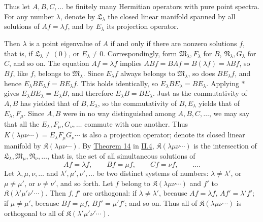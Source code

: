 \documentclass[fontsize=13pt,twoside,openany,headings=normal,parskip=false,bookmarkpackage=false,DIV=calc]{scrbook}
\begin{document}
Thus let $A,B,C,\ldots$ be finitely many Hermitian operators with pure point spectra. For any number $\lambda$, denote by $\mathfrak L_\lambda$ the closed linear manifold spanned by all solutions of $Af=\lambda f$, and by $E_\lambda$ its projection operator.

\hypertarget{origpage-91}{}%
Then $\lambda$ is a point eigenvalue of $A$ if and only if there are nonzero solutions $f$, that is, if $\mathfrak L_\lambda\ne(0)$, or $E_\lambda\ne0$. Correspondingly, form $\mathfrak M_\lambda,F_\lambda$ for $B$, $\mathfrak N_\lambda,G_\lambda$ for $C$, and so on. The equation $Af=\lambda f$ implies $ABf=BAf=B(\lambda f)=\lambda Bf$, so $Bf$, like $f$, belongs to $\mathfrak M_\lambda$.  Since $E_\lambda f$ always belongs to $\mathfrak M_\lambda$, so does $BE_\lambda f$, and hence $E_\lambda BE_\lambda f=BE_\lambda f$. This holds identically, so $E_\lambda BE_\lambda=BE_\lambda$. Applying $*$ gives $E_\lambda BE_\lambda=E_\lambda B$, and therefore $E_\lambda B=BE_\lambda$. Just as the commutativity of $A,B$ has yielded that of $B,E_\lambda$, so the commutativity of $B,E_\lambda$ yields that of $E_\lambda,F_\mu$. Since $A,B$ were in no way distinguished among $A,B,C,\ldots$, we may say that all the $E_\lambda,F_\mu,G_\nu,\ldots$ commute with one another. Thus $K(\lambda\mu\nu\cdots)=E_\lambda F_\mu G_\nu\cdots$ is also a projection operator; denote its closed linear manifold by $\mathfrak K(\lambda\mu\nu\cdots)$. By \hyperref[thm:II.14]{Theorem 14} in \hyperref[sec:II.4]{II.4}, $\mathfrak K(\lambda\mu\nu\cdots)$ is the intersection of $\mathfrak L_\lambda,\mathfrak M_\mu,\mathfrak N_\nu,\ldots$, that is, the set of all simultaneous solutions of
\[
Af=\lambda f,\qquad Bf=\mu f,\qquad Cf=\nu f,\qquad\ldots.
\]
Let $\lambda,\mu,\nu,\ldots$ and $\lambda',\mu',\nu',\ldots$ be two distinct systems of numbers: $\lambda\ne\lambda'$, or $\mu\ne\mu'$, or $\nu\ne\nu'$, and so forth. Let $f$ belong to $\mathfrak K(\lambda\mu\nu\cdots)$ and $f'$ to $\mathfrak K(\lambda'\mu'\nu'\cdots)$. Then $f,f'$ are orthogonal: if $\lambda\ne\lambda'$, because $Af=\lambda f$, $Af'=\lambda'f'$; if $\mu\ne\mu'$, because $Bf=\mu f$, $Bf'=\mu'f'$; and so on. Thus all of $\mathfrak K(\lambda\mu\nu\cdots)$ is orthogonal to all of $\mathfrak K(\lambda'\mu'\nu'\cdots)$.
\end{document}
